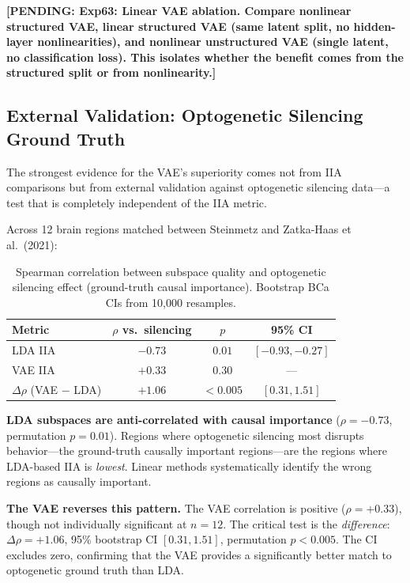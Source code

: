 \documentclass{article}
\newcommand{\pending}[1]{\textcolor{red!70!black}{\textbf{[PENDING: #1]}}}
\begin{document}
\pending{Exp63: Linear VAE ablation. Compare nonlinear structured VAE, linear structured VAE (same latent split, no hidden-layer nonlinearities), and nonlinear unstructured VAE (single latent, no classification loss). This isolates whether the benefit comes from the structured split or from nonlinearity.}

\subsection{External Validation: Optogenetic Silencing Ground Truth}

The strongest evidence for the VAE's superiority comes not from IIA comparisons but from external validation against optogenetic silencing data---a test that is completely independent of the IIA metric.

Across 12 brain regions matched between Steinmetz and Zatka-Haas et al.\ (2021):

\begin{table}[h]
\centering
\small
\caption{Spearman correlation between subspace quality and optogenetic silencing effect (ground-truth causal importance). Bootstrap BCa CIs from 10,000 resamples.}
\label{tab:silencing}
\begin{tabular}{lccc}
\toprule
Metric & $\rho$ vs.\ silencing & $p$ & 95\% CI \\
\midrule
LDA IIA & $-0.73$ & $0.01$ & $[-0.93, -0.27]$ \\
VAE IIA & $+0.33$ & $0.30$ & --- \\
$\Delta\rho$ (VAE $-$ LDA) & $+1.06$ & $< 0.005$ & $[0.31, 1.51]$ \\
\bottomrule
\end{tabular}
\end{table}

\textbf{LDA subspaces are anti-correlated with causal importance} ($\rho = -0.73$, permutation $p = 0.01$). Regions where optogenetic silencing most disrupts behavior---the ground-truth causally important regions---are the regions where LDA-based IIA is \emph{lowest}. Linear methods systematically identify the wrong regions as causally important.

\textbf{The VAE reverses this pattern.} The VAE correlation is positive ($\rho = +0.33$), though not individually significant at $n = 12$. The critical test is the \emph{difference}: $\Delta\rho = +1.06$, 95\% bootstrap CI $[0.31, 1.51]$, permutation $p < 0.005$. The CI excludes zero, confirming that the VAE provides a significantly better match to optogenetic ground truth than LDA.
\end{document}
